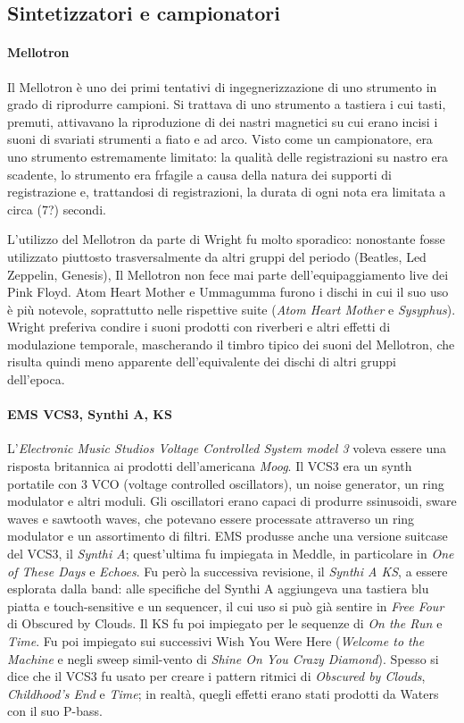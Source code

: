 \documentclass[class=book, crop=false, oneside, 12pt]{standalone}
\begin{document}
    \subsection{Sintetizzatori e campionatori}
    \paragraph{Mellotron}
    Il Mellotron è uno dei primi tentativi di ingegnerizzazione di uno strumento in grado di riprodurre campioni. Si trattava di uno strumento a tastiera i cui tasti, premuti, attivavano la riproduzione di dei nastri magnetici su cui erano incisi i suoni di svariati strumenti a fiato e ad arco. Visto come un campionatore, era uno strumento estremamente limitato: la qualità delle registrazioni su nastro era scadente, lo strumento era frfagile a causa della natura dei supporti di registrazione e, trattandosi di registrazioni, la durata di ogni nota era limitata a circa (7?) secondi.

    L'utilizzo del Mellotron da parte di Wright fu molto sporadico: nonostante fosse utilizzato piuttosto trasversalmente da altri gruppi del periodo (Beatles, Led Zeppelin, Genesis), Il Mellotron non fece mai parte dell'equipaggiamento live dei Pink Floyd. Atom Heart Mother e Ummagumma furono i dischi in cui il suo uso è più notevole, soprattutto nelle rispettive suite (\emph{Atom Heart Mother} e \emph{Sysyphus}). Wright preferiva condire i suoni prodotti con riverberi e altri effetti di modulazione temporale, mascherando il timbro tipico dei suoni del Mellotron, che risulta quindi meno apparente dell'equivalente dei dischi di altri gruppi dell'epoca.

    \paragraph{EMS VCS3, Synthi A, KS}
    L'\emph{Electronic Music Studios Voltage Controlled System model 3} voleva essere una risposta britannica ai prodotti dell'americana \emph{Moog}. Il VCS3 era un synth portatile con 3 VCO (voltage controlled oscillators), un noise generator, un ring modulator e altri moduli. Gli oscillatori erano capaci di produrre ssinusoidi, sware waves e sawtooth waves, che potevano essere processate attraverso un ring modulator e un assortimento di filtri. EMS produsse anche una versione suitcase del VCS3, il \emph{Synthi A}; quest'ultima fu impiegata in Meddle, in particolare in \emph{One of These Days} e \emph{Echoes}. Fu però la successiva revisione, il \emph{Synthi A KS}, a essere esplorata dalla band: alle specifiche del Synthi A aggiungeva una tastiera blu piatta e touch-sensitive e un sequencer, il cui uso si può già sentire in \emph{Free Four} di Obscured by Clouds. Il KS fu poi impiegato per le sequenze di \emph{On the Run} e \emph{Time}. Fu poi impiegato sui successivi Wish You Were Here (\emph{Welcome to the Machine} e negli sweep simil-vento di \emph{Shine On You Crazy Diamond}). Spesso si dice che il VCS3 fu usato per creare i pattern ritmici di \emph{Obscured by Clouds}, \emph{Childhood's End} e \emph{Time}; in realtà, quegli effetti erano stati prodotti da Waters con il suo P-bass.
\end{document}

